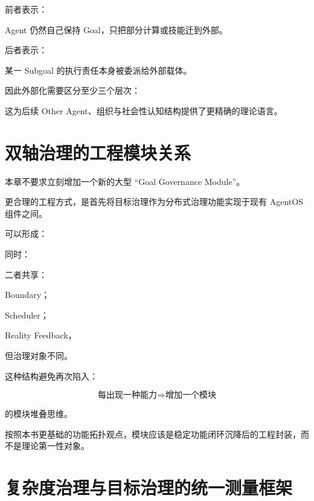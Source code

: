 前者表示：

Agent 仍然自己保持 Goal，只把部分计算或技能迁到外部。

后者表示：

某一 Subgoal 的执行责任本身被委派给外部载体。

因此外部化需要区分至少三个层次：

\begin{statementbox}
\centering
{}
\end{statementbox}

这为后续 Other Agent、组织与社会性认知结构提供了更精确的理论语言。


\section{双轴治理的工程模块关系}

本章不要求立刻增加一个新的大型 ``Goal Governance Module''。

更合理的工程方式，是首先将目标治理作为分布式治理功能实现于现有 AgentOS 组件之间。

可以形成：

\begin{statementbox}
\centering
{}
\end{statementbox}

同时：

\begin{statementbox}
\centering
{}
\end{statementbox}

二者共享：

Boundary；

Scheduler；

Reality Feedback，

但治理对象不同。

这种结构避免再次陷入：

\[
\text{每出现一种能力}
\Rightarrow
\text{增加一个模块}
\]

的模块堆叠思维。

按照本书更基础的功能拓扑观点，模块应该是稳定功能闭环沉降后的工程封装，而不是理论第一性对象。


\section{复杂度治理与目标治理的统一测量框架}

